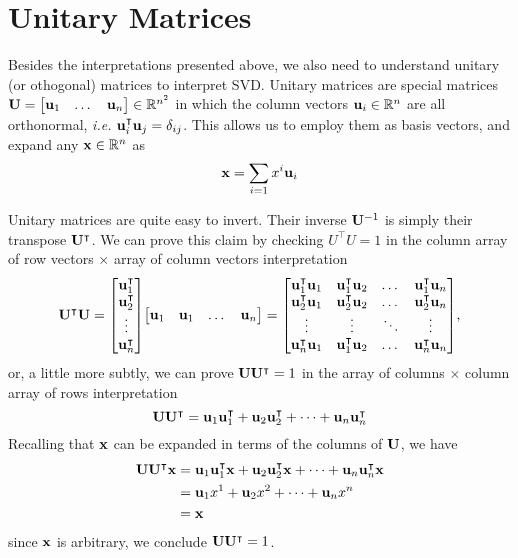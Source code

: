 \documentclass{article}
\begin{document}
\section{Unitary Matrices}
Besides the interpretations presented above, we also need to understand unitary (or othogonal) matrices to interpret SVD. Unitary matrices are special matrices $\vb{U}=\mqty[\vb{u}_1 & \dots & \vb{u}_n]\in\mathbb{R}^{n^2}$ in which the column vectors $\vb{u}_i\in\mathbb{R}^n$ are all orthonormal, \textit{i.e.} $\vb{u}_i^\intercal \vb{u}_j = \delta_{ij}$. This allows us to employ them as basis vectors, and expand any $\vb{x}\in\mathbb{R}^n$ as $$\vb{x}= \sum_{i=1} x^i \vb{u}_i$$

Unitary matrices are quite easy to invert. Their inverse $\vb{U}^{-1}$ is simply their transpose $\vb{U}^{\intercal}$. We can prove this claim by checking $U^\intercal U = 1$ in the column array of row vectors $\times$ array of column vectors interpretation
\begin{equation}
    \vb{U}^{\intercal}\vb{U} = \mqty[\vb{u}_1^\intercal \\ \vb{u}_2^\intercal \\ \vdots \\\vb{u}_n^\intercal]\mqty[\vb{u}_1 & \vb{u}_1 & \dots & \vb{u}_n] =
        \mqty[\vb{u}_1^\intercal\vb{u}_1 & \vb{u}_1^\intercal\vb{u}_2 & \dots & \vb{u}_1^\intercal\vb{u}_n\\
        \vb{u}_2^\intercal\vb{u}_1 & \vb{u}_2^\intercal\vb{u}_2 & \dots & \vb{u}_2^\intercal\vb{u}_n\\
        \vdots & \vdots & \ddots & \vdots\\
        \vb{u}_n^\intercal\vb{u}_1 & \vb{u}_1^\intercal\vb{u}_2 & \dots & \vb{u}_n^\intercal\vb{u}_n],
\end{equation}
or, a little more subtly, we can prove $\vb{U}\vb{U}^\intercal=1$ in the array of columns $\times$ column array of rows interpretation
\begin{equation}
    \vb{U}\vb{U}^\intercal = \vb{u}_1\vb{u}_1^\intercal + \vb{u}_2\vb{u}_2^\intercal + \dots + \vb{u}_n\vb{u}_n^\intercal
\end{equation}
Recalling that $\vb{x}$ can be expanded in terms of the columns of $\vb{U}$, we have
\begin{equation}
    \begin{aligned}
    \vb{U}\vb{U}^\intercal \vb{x} &= \vb{u}_1\vb{u}_1^\intercal\vb{x} + \vb{u}_2\vb{u}_2^\intercal\vb{x} + \dots + \vb{u}_n\vb{u}_n^\intercal\vb{x}\\
       & = \vb{u}_1 x^1 + \vb{u}_2 x^2 + \dots + \vb{u}_n x^n\\
       & = \vb{x}
    \end{aligned}
 \end{equation}
 since $\vb{x}$ is arbitrary, we conclude $\vb{U}\vb{U}^\intercal=1$.
\end{document}
